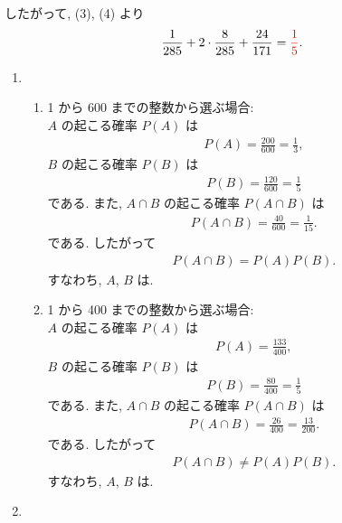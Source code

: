 \begin{qenumerate}
{\begin{enumerate}
{				したがって, (3), (4) より
				\begin{align}
					\frac{1}{285} + 2\cdot\frac{8}{285} + \frac{24}{171} = \textcolor{red}{\frac{1}{5}}.
				\end{align}
			}
		\end{enumerate}
	}
	\item{
		\begin{enumerate}
			\item{
				\begin{enumerate}
					\item{
						1 から 600 までの整数から選ぶ場合: \\
						$A$ の起こる確率 $P(A)$ は
						\begin{align}
							P(A) = \frac{200}{600} = \frac{1}{3}, 
						\end{align}
						$B$ の起こる確率 $P(B)$ は
						\begin{align}
							P(B) = \frac{120}{600} = \frac{1}{5}
						\end{align}
						である.
						また, $A\cap B$ の起こる確率 $P(A\cap B)$ は
						\begin{align}
							P(A\cap B) = \frac{40}{600} = \frac{1}{15}.
						\end{align}
						である.
						したがって
						\begin{align}
							P(A\cap B) = P(A)P(B).
						\end{align}
						すなわち, $A$, $B$ は.
					}
					\item{
						1 から 400 までの整数から選ぶ場合: \\
						$A$ の起こる確率 $P(A)$ は
						\begin{align}
							P(A) = \frac{133}{400}, 
						\end{align}
						$B$ の起こる確率 $P(B)$ は
						\begin{align}
							P(B) = \frac{80}{400} = \frac{1}{5}
						\end{align}
						である.
						また, $A\cap B$ の起こる確率 $P(A\cap B)$ は
						\begin{align}
							P(A\cap B) = \frac{26}{400} = \frac{13}{200}.
						\end{align}
						である.
						したがって
						\begin{align}
							P(A\cap B) \neq P(A)P(B).
						\end{align}
						すなわち, $A$, $B$ は.
					}
				\end{enumerate}
			}
			\item{
}
\end{enumerate}}
\end{qenumerate}
